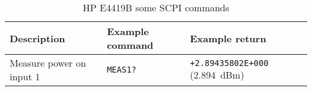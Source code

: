 \begin{table}[H]
	\centering
	\caption{HP E4419B some SCPI commands}
	\label{tab:hp-E4419B-scpi}
	\begin{tabularx}{\textwidth}{Xll}
		\toprule
		\textbf{Description} & \textbf{Example command} & \textbf{Example return}\\
		\midrule
		Measure power on input 1 & \texttt{MEAS1?} & \texttt{+2.89435802E+000} (\SI{2.894}{dBm}) \\
		\bottomrule
	\end{tabularx}
\end{table}


